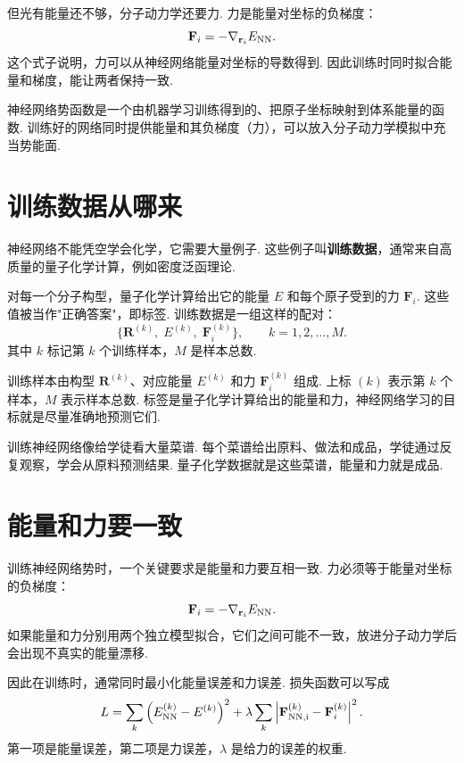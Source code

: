 \documentclass[UTF8,11pt,a4paper,openany]{ctexbook}
\newcommand{\term}[1]{\textbf{#1}}
\begin{document}
但光有能量还不够，分子动力学还要力. 力是能量对坐标的负梯度：
\[
\mathbf F_i=-\nabla_{\mathbf r_i}E_{\rm NN}.
\]
这个式子说明，力可以从神经网络能量对坐标的导数得到. 因此训练时同时拟合能量和梯度，能让两者保持一致. 

\begin{definitionbox}
神经网络势函数是一个由机器学习训练得到的、把原子坐标映射到体系能量的函数. 训练好的网络同时提供能量和其负梯度（力），可以放入分子动力学模拟中充当势能面. 
\end{definitionbox}

\section{训练数据从哪来}

神经网络不能凭空学会化学，它需要大量例子. 这些例子叫\term{训练数据}，通常来自高质量的量子化学计算，例如密度泛函理论. 

对每一个分子构型，量子化学计算给出它的能量 $E$ 和每个原子受到的力 $\mathbf F_i$. 这些值被当作"正确答案"，即标签. 训练数据是一组这样的配对：
\[
\{\mathbf R^{(k)},\;E^{(k)},\;\mathbf F_i^{(k)}\},\qquad k=1,2,\ldots,M.
\]
其中 $k$ 标记第 $k$ 个训练样本，$M$ 是样本总数. 

\begin{notationbox}
训练样本由构型 $\mathbf R^{(k)}$、对应能量 $E^{(k)}$ 和力 $\mathbf F_i^{(k)}$ 组成. 上标 $(k)$ 表示第 $k$ 个样本，$M$ 表示样本总数. 标签是量子化学计算给出的能量和力，神经网络学习的目标就是尽量准确地预测它们. 
\end{notationbox}

\begin{analogybox}
训练神经网络像给学徒看大量菜谱. 每个菜谱给出原料、做法和成品，学徒通过反复观察，学会从原料预测结果. 量子化学数据就是这些菜谱，能量和力就是成品. 
\end{analogybox}

\section{能量和力要一致}

训练神经网络势时，一个关键要求是能量和力要互相一致. 力必须等于能量对坐标的负梯度：
\[
\mathbf F_i=-\nabla_{\mathbf r_i}E_{\rm NN}.
\]
如果能量和力分别用两个独立模型拟合，它们之间可能不一致，放进分子动力学后会出现不真实的能量漂移. 

因此在训练时，通常同时最小化能量误差和力误差. 损失函数可以写成
\[
L
=
\sum_k\left(E_{\rm NN}^{(k)}-E^{(k)}\right)^2
+
\lambda\sum_k\left|\mathbf F_{\rm NN,i}^{(k)}-\mathbf F_i^{(k)}\right|^2.
\]
第一项是能量误差，第二项是力误差，$\lambda$ 是给力的误差的权重. 
\end{document}
